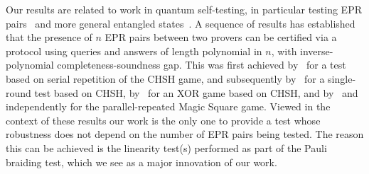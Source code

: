 \documentclass[11pt,letterpaper]{article}
\newcommand{\<}{\langle}
\renewcommand{\>}{\rangle}
\DeclareMathOperator{\poly}{poly}
\newcommand{\tnote}[1]{\textcolor{magenta}{\small {\textbf{(Thomas:}
      #1\textbf{) }}}}
\newcommand{\tnote}[1]{{}}
\begin{document}

Our results are related to work in quantum self-testing, in particular testing EPR
pairs~\cite{McKagueYS12rigidity} and more general entangled
states~\cite{mckague2014self}. A sequence of results has established that the presence of $n$ EPR pairs between two provers can be certified via a protocol
using queries and answers of length polynomial in $n$, with
inverse-polynomial completeness-soundness gap. This was first
achieved by~\cite{ReichardtUV13nature} for a test based on serial
repetition of the CHSH game, and subsequently by~\cite{McKague15} for
a single-round test based on CHSH, by~\cite{OV16} for an XOR game
based on CHSH, and by~\cite{CN16}
and~\cite{Coladangelo16} independently for the parallel-repeated Magic
Square game. Viewed in the context of these results our work is the only one to provide a test whose robustness does not depend on the number of EPR pairs being tested. The reason this can be achieved is the linearity test(s) performed as part of the Pauli braiding test, which we see as a major innovation of our work. 


\end{document}
